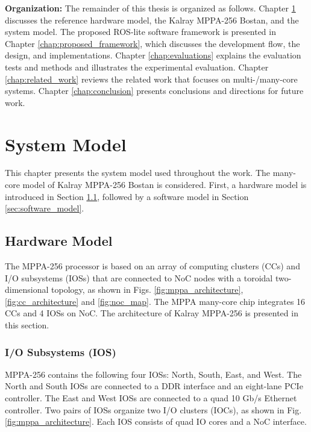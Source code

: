 \textbf{Organization:}
The remainder of this thesis is organized as follows.
Chapter \ref{chap:system_model} discusses the reference hardware model, the Kalray MPPA-256 Bostan, and the system model.
The proposed ROS-lite software framework is presented in Chapter \ref{chap:proposed_framework}, which discusses the development flow, the design, and implementations.
Chapter \ref{chap:evaluations} explains the evaluation tests and methods and illustrates the experimental evaluation.
Chapter \ref{chap:related_work} reviews the related work that focuses on multi-/many-core systems.
Chapter \ref{chap:conclusion} presents conclusions and directions for future work.


\chapter{System Model}
\label{chap:system_model}
This chapter presents the system model used throughout the work.
The many-core model of Kalray MPPA-256 Bostan is considered.
First, a hardware model is introduced in Section \ref{sec:hardware_model}, followed by a software model in Section \ref{sec:software_model}.

\section{Hardware Model}
\label{sec:hardware_model}
The MPPA-256 processor is based on an array of computing clusters (CCs) and I/O subsystems (IOSs) that are connected to NoC nodes with a toroidal two-dimensional topology, as shown in Figs. \ref{fig:mppa_architecture}, \ref{fig:cc_architecture} and \ref{fig:noc_map}.
The MPPA many-core chip integrates 16 CCs and 4 IOSs on NoC.
The architecture of Kalray MPPA-256 is presented in this section.

\subsection{I/O Subsystems (IOS)}
\label{sec:ios}
MPPA-256 contains the following four IOSs: North, South, East, and West.
The North and South IOSs are connected to a DDR interface and an eight-lane PCIe controller.
The East and West IOSs are connected to a quad 10 Gb/s Ethernet controller.
Two pairs of IOSs organize two I/O clusters (IOCs), as shown in Fig. \ref{fig:mppa_architecture}.
Each IOS consists of quad IO cores and a NoC interface.

